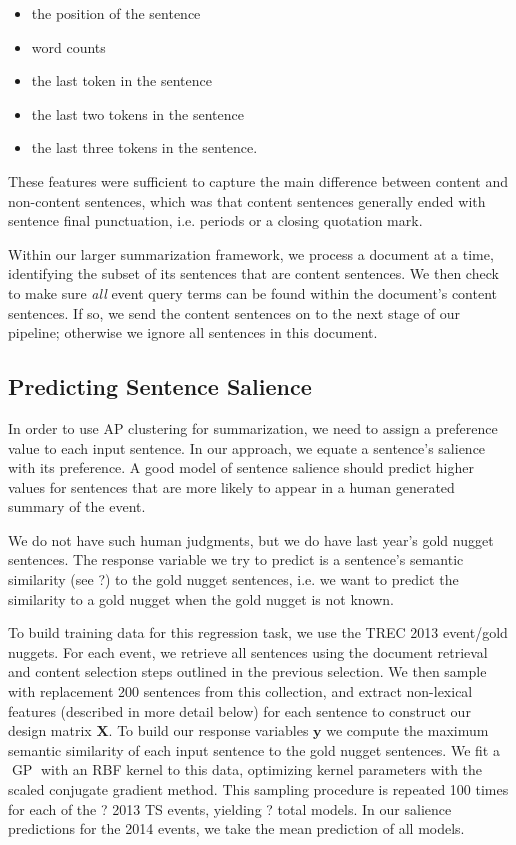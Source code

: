 \documentclass[10pt]{article} \usepackage{url} \usepackage{color}
\begin{document}
\begin{itemize}
 \item the position of the sentence
 \item word counts
 \item the last token in the sentence
 \item the last two tokens in the sentence
 \item the last three tokens in the sentence.
\end{itemize} 

These features were sufficient to capture 
the main difference between content and non-content sentences,
which 
was that content sentences generally ended with sentence final punctuation, 
i.e. periods or a closing quotation mark. 

Within our larger summarization framework, we process a document at a time,
identifying the subset of its sentences that are content sentences.
We then check to make sure \emph{all} event
query terms can be found within the document's content sentences. If so,
we send the content sentences on to the next stage of our pipeline; otherwise
we ignore all sentences in this document.

\subsection{Predicting Sentence Salience}\label{subsec:Predict}

In order to use AP clustering for summarization, we need to assign a
preference value to each input sentence.  In our approach, we equate a
sentence's salience with its preference.  A good model of sentence salience
should predict higher values for sentences that are more likely to appear in a
human generated summary of the event. 

We do not have such human judgments, but we do have last year's gold nugget
sentences.
The response variable we try to predict is a sentence's semantic similarity
(see ?) to the gold nugget sentences, i.e. we want to predict the similarity
to a gold nugget when the gold nugget is not known.


To build training data for this regression task, 
we use the TREC 2013 event/gold nuggets. For each event, we retrieve all 
sentences using the document retrieval and content selection steps outlined
in the previous selection. We then sample with replacement 200 sentences
from this collection, and extract non-lexical features (described in more 
detail below) for each sentence
to construct our design matrix $\mathbf{X}$. To build our response variables
$\mathbf{y}$ we compute the maximum semantic similarity of each input
sentence to the gold nugget sentences. We fit a $\operatorname{GP}$ with
an RBF kernel to this data, optimizing kernel parameters with the scaled 
conjugate gradient method. This sampling procedure is repeated 100 times
for each of the ? 2013 TS events, yielding ? total models. In our salience 
predictions for the 2014 events, we take the mean prediction of all models.
\end{document}
